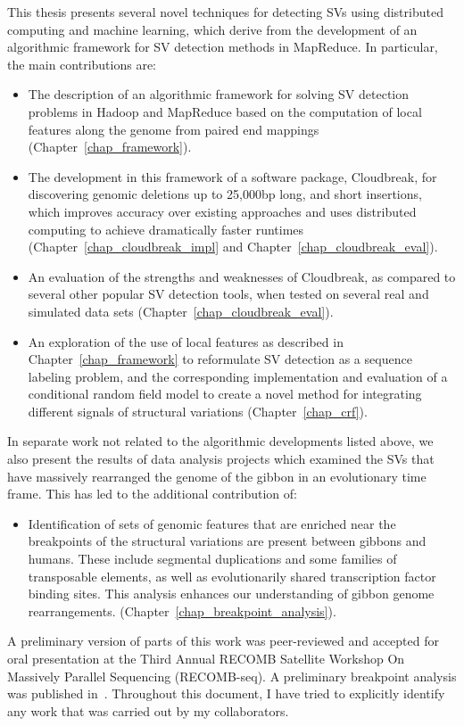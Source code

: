 This thesis presents several novel techniques for detecting SVs using distributed computing and machine learning, which derive from the development of an algorithmic framework for SV detection methods in MapReduce. In particular, the main contributions are:

\begin{itemize}
 \item The description of an algorithmic framework for solving SV detection problems in Hadoop and MapReduce based on the computation of local features along the genome from paired end mappings (Chapter~\ref{chap_framework}).
 \item The development in this framework of a software package, Cloudbreak, for discovering genomic deletions up to 25,000bp long, and short insertions, which improves accuracy over existing approaches and uses distributed computing to achieve dramatically faster runtimes (Chapter~\ref{chap_cloudbreak_impl} and Chapter~\ref{chap_cloudbreak_eval}).
 \item An evaluation of the strengths and weaknesses of Cloudbreak, as compared to several other popular SV detection tools, when tested on several real and simulated data sets (Chapter~\ref{chap_cloudbreak_eval}).
 \item An exploration of the use of local features as described in Chapter~\ref{chap_framework} to reformulate SV detection as a sequence labeling problem, and the corresponding implementation and evaluation of a conditional random field model to create a novel method for integrating different signals of structural variations (Chapter~\ref{chap_crf}).
\end{itemize}

In separate work not related to the algorithmic developments listed above, we also present the results of data analysis projects which examined the SVs that have massively rearranged the genome of the gibbon in an evolutionary time frame. This has led to the additional contribution of:

\begin{itemize}
 \item Identification of sets of genomic features that are enriched near the breakpoints of the structural variations are present between gibbons and humans. These include segmental duplications and some families of transposable elements, as well as evolutionarily shared transcription factor binding sites. This analysis enhances our understanding of gibbon genome rearrangements. (Chapter~\ref{chap_breakpoint_analysis}).
\end{itemize}

A preliminary version of parts of this work was peer-reviewed and accepted for oral presentation at the Third Annual RECOMB Satellite Workshop On Massively Parallel Sequencing (RECOMB-seq). A preliminary breakpoint analysis was published in~\cite{Capozzi:2012bb}. Throughout this document, I have tried to explicitly identify any work that was carried out by my collaborators.

